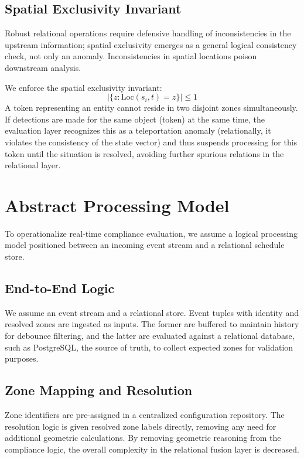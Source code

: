 \documentclass[conference]{IEEEtran}
\begin{document}
\subsection{Spatial Exclusivity Invariant}
Robust relational operations require defensive handling of inconsistencies in the upstream information; spatial exclusivity emerges as a general logical consistency check, not only an anomaly. Inconsistencies in spatial locations poison downstream analysis.

We enforce the spatial exclusivity invariant:
\begin{equation}
|\{z : \text{Loc}(s_i,t)=z\}| \le 1
\end{equation}
A token representing an entity cannot reside in two disjoint zones simultaneously. If detections are made for the same object (token) at the same time, the evaluation layer recognizes this as a teleportation anomaly (relationally, it violates the consistency of the state vector) and thus suspends processing for this token until the situation is resolved, avoiding further spurious relations in the relational layer.

\section{Abstract Processing Model}

To operationalize real-time compliance evaluation, we assume a logical processing model positioned between an incoming event stream and a relational schedule store.

\subsection{End-to-End Logic}
We assume an event stream and a relational store. Event tuples with identity and resolved zones are ingested as inputs. The former are buffered to maintain history for debounce filtering, and the latter are evaluated against a relational database, such as PostgreSQL, the source of truth, to collect expected zones for validation purposes.

\subsection{Zone Mapping and Resolution}
Zone identifiers are pre-assigned in a centralized configuration repository. The resolution logic is given resolved zone labels directly, removing any need for additional geometric calculations. By removing geometric reasoning from the compliance logic, the overall complexity in the relational fusion layer is decreased.
\end{document}
